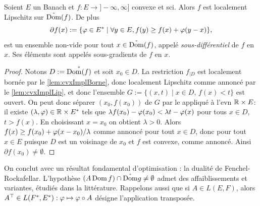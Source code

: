 

\begin{theorem}
\label{th:ssGrad}
%
	Soient $E$ un Banach et $f : E \to ]-\infty,\infty]$ convexe et sci. Alors $f$ est localement Lipschitz sur $\mathring{\operatorname{Dom}}(f)$. De plus %
	\begin{equation*}
		\partial f(x) := \{\varphi \in E^* \mid \forall y \in E, f(y) \geq f(x) + \varphi(y-x)\},
	\end{equation*}
	est un ensemble non-vide pour tout $x \in \mathring {\operatorname{Dom}}(f)$, appelé \emph{sous-différentiel} de $f$ en $x$. Ses éléments sont appelés sous-gradients de $f$ en $x$.
\end{theorem}

\begin{proof}	
	Notons $D := \mathring{\operatorname{Dom}(f)}$ et soit $x_0 \in D$. 
	La restriction $f_{|D}$ est localement bornée par le \cref{lem:cvxImplBorne}, donc localement Lipschitz comme annoncé par le \cref{lem:cvxImplLip}, et donc l'ensemble $G := \{(x,t)\mid x \in D,\, f(x) < t\}$ est ouvert. On peut donc séparer $(x_0,f(x_0))$ de $G$ par le  appliqué à l'evn $\mathbb{R} \times E$: il existe $(\lambda,\varphi) \in \mathbb{R} \times E^*$ tels que $\lambda f(x_0) - \varphi(x_0) < \lambda t - \varphi(x)$ pour tous $x\in D$, $t>f(x)$. En choisissant $x=x_0$ on obtient $\lambda >0$. Alors $f(x) \geq f(x_0) + \varphi(x-x_0)/\lambda$ comme annoncé pour tout $x \in D$, donc pour tout $x \in E$ puisque $D$ est un voisinage de $x_0$ et $f$ est convexe, comme annoncé. Ainsi $\partial f(x_0) \neq \emptyset$. 
\end{proof}

On conclut avec un résultat fondamental d'optimisation : la dualité de Fenchel-Rockafellar. 
L'hypothèse $(A \operatorname{Dom} f) \cap \mathring{\operatorname{Dom}} g \neq \emptyset$ admet des affaiblissements et variantes, étudiés dans la littérature.
Rappelons aussi que si $A\in L(E,F)$, alors $A^\top \in L(F^*,E^*) : \varphi \mapsto \varphi \circ A$ désigne l'application transposée.


